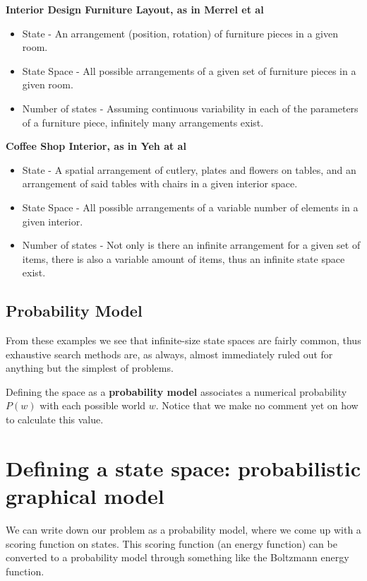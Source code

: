\documentclass[]{article}
\begin{document}
\textbf{Interior Design Furniture Layout, as in Merrel et al \cite{DBLP:journals/tog/MerrellSLAK11}}
\begin{itemize}
	\item State - An arrangement (position, rotation) of furniture pieces in a given room.
	\item State Space - All possible arrangements of a given set of furniture pieces in a given room. 
	\item Number of states - Assuming continuous variability in each of the parameters of a furniture piece, infinitely many arrangements exist.
\end{itemize}

\textbf{Coffee Shop Interior, as in Yeh at al \cite{Yeh:2012:SOW:2185520.2185552}}
\begin{itemize}
	\item State - A spatial arrangement of cutlery, plates and flowers on tables, and an arrangement of said tables with chairs in a given interior space.
	\item State Space - All possible arrangements of a variable number of elements in a given interior.
	\item Number of states - Not only is there an infinite arrangement for a given set of items, there is also a variable amount of items, thus an infinite state space exist.
\end{itemize}

\subsection{Probability Model}

From these examples we see that infinite-size state spaces are fairly common, thus exhaustive search methods are, as always, almost immediately ruled out for anything but the simplest of problems. 


Defining the space as a \textbf{probability model} associates a numerical probability $P(w)$ with each possible world $w$. Notice that we make no comment yet on how to calculate this value.




\section{Defining a state space: probabilistic graphical model}

We can write down our problem as a probability model, where we come up with a scoring function on states. This scoring function (an energy function) can be converted to a probability model through something like the Boltzmann energy function.
\end{document}
